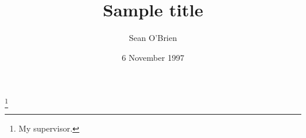 \documentclass{amsart}
\begin{document}
\title{Sample title}


\author{Sean O'Brien}
\address{}
\curraddr{}
\thanks{My supervisor.}




\date{6 November 1997}


\begin{abstract}
\end{abstract}

\maketitle

\tableofcontents





\end{document}
